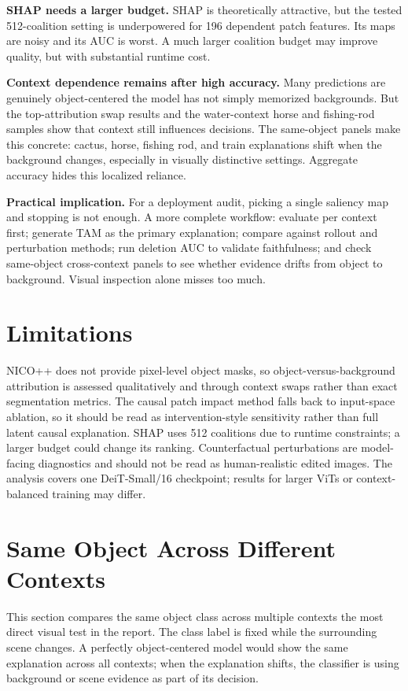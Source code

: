 \documentclass[10pt]{article}
\begin{document}
\textbf{SHAP needs a larger budget.} SHAP is theoretically attractive, but the tested 512-coalition setting is underpowered for 196 dependent patch features. Its maps are noisy and its AUC is worst. A much larger coalition budget may improve quality, but with substantial runtime cost.

\textbf{Context dependence remains after high accuracy.} Many predictions are genuinely object-centered the model has not simply memorized backgrounds. But the top-attribution swap results and the water-context horse and fishing-rod samples show that context still influences decisions. The same-object panels make this concrete: cactus, horse, fishing rod, and train explanations shift when the background changes, especially in visually distinctive settings. Aggregate accuracy hides this localized reliance.

\textbf{Practical implication.} For a deployment audit, picking a single saliency map and stopping is not enough. A more complete workflow: evaluate per context first; generate TAM as the primary explanation; compare against rollout and perturbation methods; run deletion AUC to validate faithfulness; and check same-object cross-context panels to see whether evidence drifts from object to background. Visual inspection alone misses too much.

\section{Limitations}
NICO++ does not provide pixel-level object masks, so object-versus-background attribution is assessed qualitatively and through context swaps rather than exact segmentation metrics. The causal patch impact method falls back to input-space ablation, so it should be read as intervention-style sensitivity rather than full latent causal explanation. SHAP uses 512 coalitions due to runtime constraints; a larger budget could change its ranking. Counterfactual perturbations are model-facing diagnostics and should not be read as human-realistic edited images. The analysis covers one DeiT-Small/16 checkpoint; results for larger ViTs or context-balanced training may differ.

\clearpage
\section{Same Object Across Different Contexts}
\label{sec:same-object}
This section compares the same object class across multiple contexts the most direct visual test in the report. The class label is fixed while the surrounding scene changes. A perfectly object-centered model would show the same explanation across all contexts; when the explanation shifts, the classifier is using background or scene evidence as part of its decision.
\end{document}
